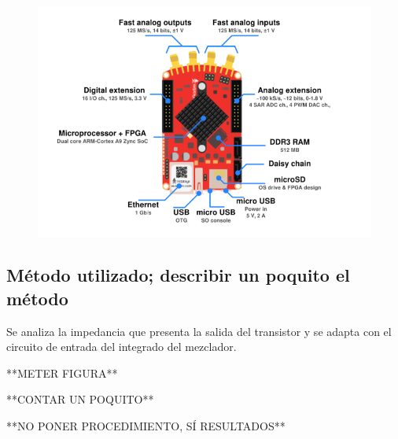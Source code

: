 \documentclass{article}
\begin{document}
\begin{figure}[H]
  \centering
    \includegraphics[scale=0.7]{PITAYA}
  \caption{  }
\end{figure}

\subsection{Método utilizado; describir un poquito el método}
Se analiza la impedancia que presenta la salida del transistor y se adapta con el circuito de entrada del integrado del mezclador.

**METER FIGURA**

**CONTAR UN POQUITO**

**NO PONER PROCEDIMIENTO, SÍ RESULTADOS**
\end{document}

